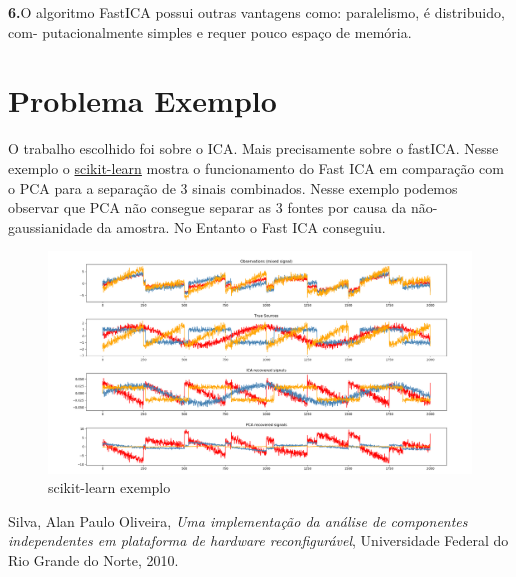 \documentclass[a4paper, 12pt]{article}
\begin{document}
\textbf{6.}O algoritmo FastICA possui outras vantagens como: paralelismo, é distribuido, com-
putacionalmente simples e requer pouco espaço de memória. \\

\cite{lamport94}
\section{Problema Exemplo}
O trabalho escolhido foi sobre o ICA. Mais precisamente sobre o fastICA.  
Nesse exemplo o \href{https://scikit-learn.org/stable/auto_examples/decomposition/plot_ica_blind_source_separation.html#sphx-glr-auto-examples-decomposition-plot-ica-blind-source-separation-py}{scikit-learn}
mostra o funcionamento do Fast ICA em comparação com o PCA para a separação de 3 sinais combinados. Nesse exemplo podemos observar que PCA não consegue separar as 3 fontes por causa da não-gaussianidade da amostra. No Entanto o Fast ICA conseguiu.  

\begin{figure}
\caption{scikit-learn exemplo}
\hspace*{-5.5cm}
\includegraphics[width=1.8\textwidth]{images/ica_exemple.png}
\end{figure}

\begin{thebibliography}{9}
  Silva, Alan Paulo Oliveira,
  \textit{Uma implementação da análise de componentes independentes em plataforma de hardware reconfigurável},
   Universidade Federal do Rio Grande do Norte,
  2010.
\end{thebibliography}
\end{document}
